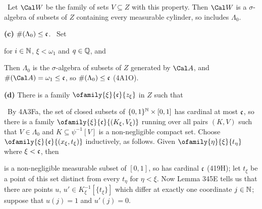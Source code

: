 {\noindent \Prf\ Let $\Cal W$ be the family of sets
$V\subseteq Z$ with this property.   Then $\Cal W$ is a $\sigma$-algebra
of subsets of $Z$ containing every measurable cylinder,
so includes $\Lambda_0$.\ \QeD\

\medskip

{\bf (c)} $\#(\Lambda_0)\le\frak c$.   \Prf\ Set


\noindent for $i\in\Bbb N$,
$\xi<\omega_1$ and $q\in\Bbb Q$, and


\noindent Then $\Lambda_0$ is the
$\sigma$-algebra of subsets of $Z$ generated by
$\Cal A$, and $\#(\Cal A)=\omega_1\le\frak c$,
so $\#(\Lambda_0)\le\frak c$ (4A1O).\ \Qed

\medskip

{\bf (d)} There is a family $\ofamily{\xi}{\frak c}{z_{\xi}}$ in
$Z$ such that


\noindent\Prf\ By 4A3Fa, the set of closed subsets of
$\{0,1\}^{\Bbb N}\times[0,1]$ has
cardinal at most $\frak c$, so there is a family
$\ofamily{\xi}{\frak c}{(K_{\xi},V_{\xi})}$ running over all pairs $(K,V)$
such that $V\in\Lambda_0$ and
$K\subseteq\psi^{-1}[V]$ is a non-negligible compact set.
Choose $\ofamily{\xi}{\frak c}{(x_{\xi},t_{\xi})}$ inductively, as follows.
Given $\ofamily{\eta}{\xi}{t_{\eta}}$ where $\xi<\frak c$, then


\noindent is a non-negligible measurable subset of $[0,1]$,
so has cardinal $\frak c$ (419H);  let $t_{\xi}$ be a point of this set
distinct from every $t_{\eta}$ for $\eta<\xi$.   Now Lemma 345E tells us
that there are points $u$, $u'\in K_{\xi}^{-1}[\{t_{\xi}\}]$
which differ at exactly one coordinate $j\in\Bbb N$;  suppose that
$u(j)=1$ and $u'(j)=0$.

}
